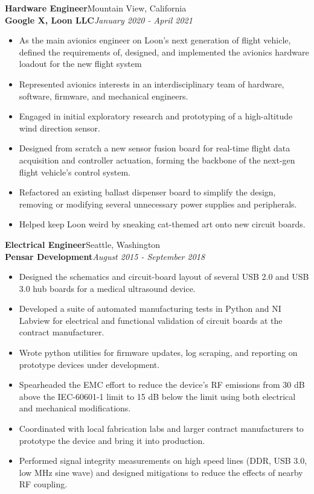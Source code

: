 \documentclass[a4paper, 11pt]{article}
\begin{document}
  \textbf{Hardware Engineer}\hfill Mountain View, California\\
  \textbf{Google X, Loon LLC}\hfill \emph{January 2020 - April 2021}\smallskip
  \begin{itemize}[nosep]
    \item As the main avionics engineer on Loon's next generation of flight vehicle, defined the requirements of, designed, and implemented the avionics hardware loadout for the new flight system
    \item Represented avionics interests in an interdisciplinary team of hardware, software, firmware, and mechanical engineers.
    \item Engaged in initial exploratory research and prototyping of a high-altitude wind direction sensor.
    \item Designed from scratch a new sensor fusion board for real-time flight data acquisition and controller actuation, forming the backbone of the next-gen flight vehicle's control system.
    \item Refactored an existing ballast dispenser board to simplify the design, removing or modifying several unnecessary power supplies and peripherals.
    \item Helped keep Loon weird by sneaking cat-themed art onto new circuit boards.
  \end{itemize}
  \medskip

  \textbf{Electrical Engineer}\hfill Seattle, Washington\\
  \textbf{Pensar Development}\hfill \emph{August 2015 - September 2018}\smallskip
  \begin{itemize}[nosep]
    \item Designed the schematics and circuit-board layout of several USB 2.0 and USB 3.0 hub boards for a medical ultrasound device.
    \item Developed a suite of automated manufacturing tests in Python and NI Labview for electrical and functional validation of circuit boards at the contract manufacturer.
    \item Wrote python utilities for firmware updates, log scraping, and reporting on prototype devices under development.
    \item Spearheaded the EMC effort to reduce the device's RF emissions from 30 dB above the IEC-60601-1 limit to 15 dB below the limit using both electrical and mechanical modifications.
    \item Coordinated with local fabrication labs and larger contract manufacturers to prototype the device and bring it into production.
    \item Performed signal integrity measurements on high speed lines (DDR, USB 3.0, low MHz sine wave) and designed mitigations to reduce the effects of nearby RF coupling.
  \end{itemize}
  \medskip
\end{document}
